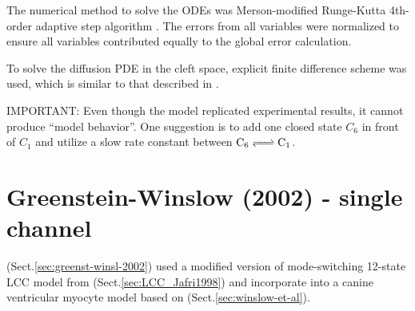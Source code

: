 The numerical method to solve the ODEs was Merson-modified Runge-Kutta 4th-order
adaptive step algorithm \citep{kubicek1983}. The errors from all variables were
normalized to ensure all variables contributed equally to the global error
calculation. 

To solve the diffusion PDE in the cleft space, explicit finite difference scheme
was used, which is similar to that described in \citep{smith1998}.




IMPORTANT: Even though the model replicated experimental results, it cannot
produce ``model behavior''. One suggestion is to add one closed state $C_6$ in
front of $C_1$ and utilize a slow rate constant between $\ce{C6 <=> C1}$.


\section{Greenstein-Winslow (2002) - single channel}
\label{sec:LCC_greenstein2002}

\citep{greenstein2002} (Sect.\ref{sec:greenst-winsl-2002}) used a modified version of
mode-switching 12-state LCC model from \citep{jafri1998cad}
(Sect.\ref{sec:LCC_Jafri1998}) and incorporate into a canine ventricular
myocyte model based on \citep{winslow1999} (Sect.\ref{sec:winslow-et-al}). 

